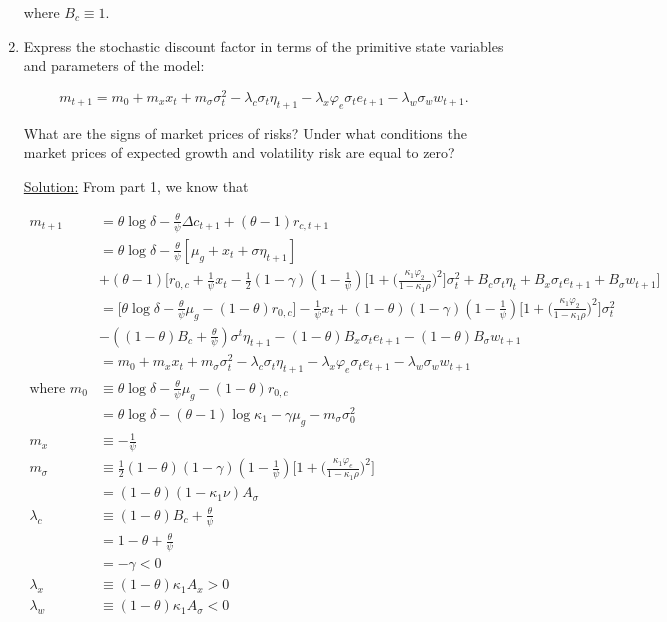 \documentclass{article}
\begin{document}
\begin{enumerate}
where $B_c \equiv 1$.

\pagebreak

\item Express the stochastic discount factor in terms of the primitive state variables and parameters of the model:

$$
m_{t+1} = m_0 + m_x x_t + m_\sigma \sigma_t^2 - \lambda_c \sigma_t \eta_{t+1} - \lambda_x \varphi_e \sigma_t e_{t+1} - \lambda_w \sigma_w w_{t+1}.
$$

What are the signs of market prices of risks? Under what conditions the market prices of expected growth and volatility risk are equal to zero?

\underline{Solution:}  From part 1, we know that

\begin{align*}
m_{t+1} 
&= \theta \log \delta - \frac{\theta}{\psi} \Delta c_{t+1} + (\theta - 1) r_{c,t+1}\\
&= \theta \log \delta - \frac{\theta}{\psi} [\mu_g + x_t + \sigma \eta_{t+1}] \\
&+ (\theta - 1) \Bigg[r_{0,c} + \frac{1}{\psi} x_t - \frac{1}{2}(1-\gamma)(1-\frac{1}{\psi}) \Bigg[1 + \Big(\frac{\kappa_1 \varphi_2}{1 - \kappa_1 \rho}\Big)^2 \Bigg]\sigma_t^2 + B_c \sigma_t \eta_t + B_x \sigma_t e_{t+1} + B_\sigma w_{t+1}\Bigg]\\
&= \Bigg[\theta \log \delta - \frac{\theta}{\psi}\mu_g - (1 - \theta) r_{0,c} \Bigg]
- \frac{1}{\psi} x_t 
+ (1-\theta)(1-\gamma)(1 - \frac{1}{\psi})\Bigg[1 + \Big(\frac{\kappa_1 \varphi_2}{1 - \kappa_1 \rho}\Big)^2 \Bigg] \sigma_t^2 \\
&- ((1-\theta)B_c + \frac{\theta}{\psi}) \sigma^t \eta_{t+1} - (1-\theta)B_x \sigma_t e_{t+1} - (1-\theta)B_\sigma w_{t+1}\\
&= m_0 + m_x x_t + m_\sigma \sigma_t^2 - \lambda_c \sigma_t\eta_{t+1} - \lambda_x \varphi_e \sigma_t e_{t+1} - \lambda_w \sigma_w w_{t+1}\\
\text{where } m_0 &\equiv \theta \log \delta - \frac{\theta}{\psi}\mu_g - (1 - \theta) r_{0,c}\\
&= \theta \log \delta - (\theta - 1) \log \kappa_1 - \gamma \mu_g - m_\sigma \sigma_0^2\\
m_x &\equiv -\frac{1}{\psi} \\
m_\sigma &\equiv \frac{1}{2}(1-\theta)(1-\gamma)(1 - \frac{1}{\psi})\Bigg[1 + \Big(\frac{\kappa_1 \varphi_e}{1 - \kappa_1 \rho}\Big)^2 \Bigg] \\
&= (1 - \theta)  (1 - \kappa_1\nu) A_\sigma\\
\lambda_c &\equiv (1 - \theta) B_c + \frac{\theta}{\psi} \\
&= 1 - \theta + \frac{\theta}{\psi} \\
&= -\gamma < 0\\
\lambda_x &\equiv (1-\theta) \kappa_1 A_x > 0\\
\lambda_w &\equiv (1-\theta) \kappa_1 A_\sigma  < 0
\end{align*}


\end{enumerate}
\end{document}
